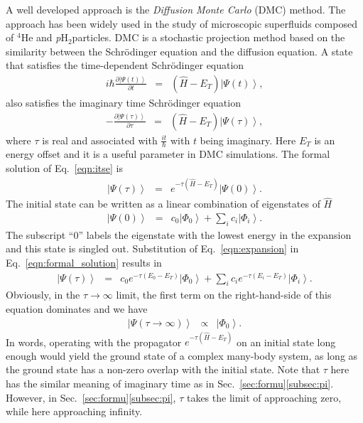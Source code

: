 \documentclass[12pt]{iopart}
\newcommand{\phtwo}{{\em p}H$_2$}
\begin{document}
A well developed approach is the {\em Diffusion Monte Carlo} (DMC) method.
The approach has been widely used in the study of microscopic superfluids composed of $^4$He and \phtwo particles.
DMC is a stochastic projection method based on the similarity between the Schr\"odinger equation and the diffusion equation. A state that satisfies the time-dependent Schr\"odinger equation
\begin{eqnarray}
i\hbar\frac{\partial \left|\Psi \left(t \right)\right>}{\partial t}&=&\left( \hat{H} - E_T \right)\left|\Psi \left(t \right)\right>,
\end{eqnarray}
also satisfies the imaginary time Schr\"odinger equation
\begin{eqnarray}
-\frac{\partial \left|\Psi \left(\tau \right)\right>}{\partial \tau}&=&\left( \hat{H} - E_T \right)\left|\Psi \left(\tau \right)\right>, \label{eqn:itse}
\end{eqnarray}
where $\tau$ is real and associated with $\frac{it}{\hbar}$ with $t$ being imaginary.
Here $E_T$ is an energy offset and it is a useful parameter in DMC simulations. 
The formal solution of Eq.~\ref{eqn:itse} is
\begin{eqnarray}
\left|\Psi \left(\tau \right)\right>&=&e^{ -\tau\left(\hat{H} - E_T \right)}\left|\Psi \left(0 \right)\right>. \label{eqn:formal_solution}
\end{eqnarray}
The initial state can be written as a linear combination of eigenstates of $\hat{H}$
\begin{eqnarray}
\left|\Psi \left(0 \right)\right>&=&c_0\left|\Phi_0\right>+\sum_i c_i \left|\Phi_i\right>. \label{eqn:expansion}
\end{eqnarray}
The subscript ``0'' labels the eigenstate with the lowest energy in the expansion and this state is singled out. Substitution of Eq.~\ref{eqn:expansion} in Eq.~\ref{eqn:formal_solution} results in
\begin{eqnarray}
\left|\Psi \left(\tau \right)\right>&=&c_0 e^{ -\tau \left(E_0 - E_T \right) }\left|\Phi_0\right>+ \sum_i c_i e^{ -\tau \left(E_i - E_T \right) }\left|\Phi_i\right>.
\end{eqnarray}
Obviously, in the $\tau\rightarrow\infty$ limit, 
the first term on the right-hand-side of this equation dominates and we have
\begin{eqnarray}
\left|\Psi \left(\tau\rightarrow\infty \right)\right>&\propto&\left|\Phi_0\right>.
\end{eqnarray}
In words, operating with the propagator 
$e^{ -\tau\left(\hat{H} - E_T \right)}$
on an initial state long enough would yield the ground state of a complex many-body system, as long as the ground state has a non-zero overlap with the initial state.
Note that $\tau$ here has the similar meaning of imaginary time as in Sec.~\ref{sec:formu}\ref{subsec:pi}. However, in Sec.~\ref{sec:formu}\ref{subsec:pi}, $\tau$ takes the limit of approaching zero, while here approaching infinity.
\end{document}

